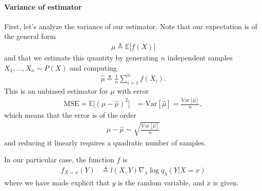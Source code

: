 \paragraph{Variance of estimator} First, let's analyze the variance of our estimator. Note that our expectation is of the general form
\begin{align*}
    \mu \triangleq \mathbb{E}\big[f(X)\big]
\end{align*}
and that we estimate this quantity by generating $n$ independent samples $X_1,\dots,X_n \sim P(X)$ and computing
\begin{align*}
    \hat{\mu} \triangleq \frac{1}{n} \sum_{i=1}^n f(X_i).
\end{align*}
This is an unbiased estimator for $\mu$ with error
\begin{align*}
    \text{MSE} = \mathbb{E}\big[(\mu - \hat{\mu})^2\big] &= \text{Var}[ \hat{\mu} ] = \frac{\text{Var}[ \hat{\mu} ]}{n},
\end{align*}
which means that the error is of the order
\begin{align*}
    \mu - \hat{\mu} \sim \sqrt{\frac{\text{Var}[ \hat{\mu} ]}{n}}
\end{align*}
and reducing it linearly requires a quadratic number of samples.

In our particular case, the function $f$ is
\begin{align*}
    f_{X=x}(Y) &\triangleq l(X,Y) \nabla_{\lambda} \log q_{\lambda}(Y|X=x)
\end{align*}
where we have made explicit that $y$ is the random variable, and $x$ is given.

